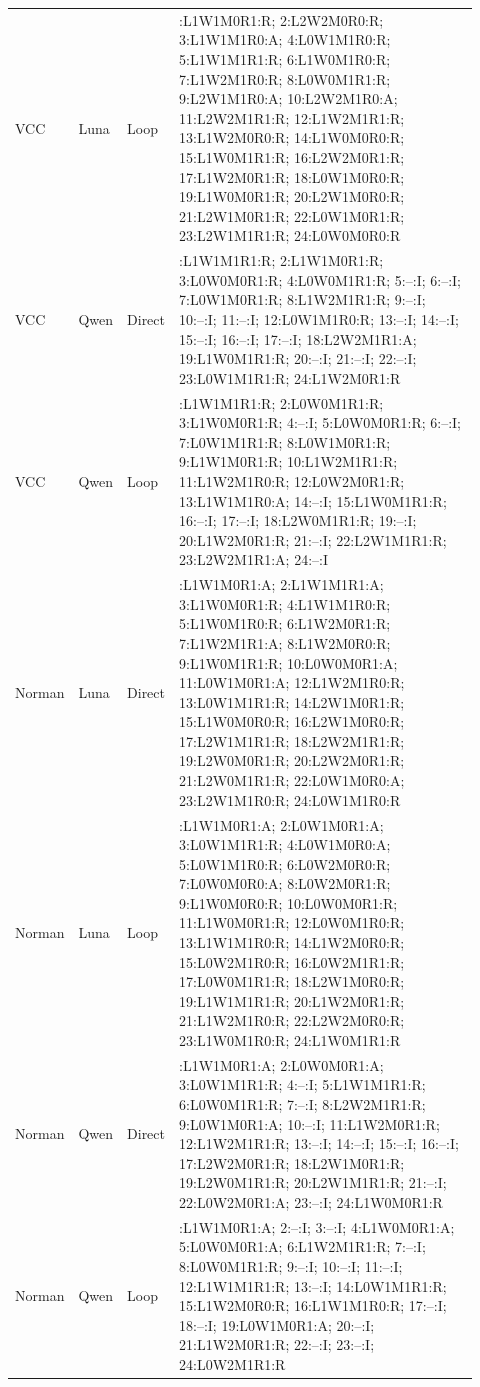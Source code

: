 \begin{longtable}{@{}p{0.10\linewidth}p{0.08\linewidth}p{0.08\linewidth}>{\raggedright\arraybackslash}p{0.66\linewidth}@{}}
VCC & Luna & Loop & 1:L1W1M0R1:R; 2:L2W2M0R0:R; 3:L1W1M1R0:A; 4:L0W1M1R0:R; 5:L1W1M1R1:R; 6:L1W0M1R0:R; 7:L1W2M1R0:R; 8:L0W0M1R1:R; 9:L2W1M1R0:A; 10:L2W2M1R0:A; 11:L2W2M1R1:R; 12:L1W2M1R1:R; 13:L1W2M0R0:R; 14:L1W0M0R0:R; 15:L1W0M1R1:R; 16:L2W2M0R1:R; 17:L1W2M0R1:R; 18:L0W1M0R0:R; 19:L1W0M0R1:R; 20:L2W1M0R0:R; 21:L2W1M0R1:R; 22:L0W1M0R1:R; 23:L2W1M1R1:R; 24:L0W0M0R0:R \\[3pt]
VCC & Qwen & Direct & 1:L1W1M1R1:R; 2:L1W1M0R1:R; 3:L0W0M0R1:R; 4:L0W0M1R1:R; 5:--:I; 6:--:I; 7:L0W1M0R1:R; 8:L1W2M1R1:R; 9:--:I; 10:--:I; 11:--:I; 12:L0W1M1R0:R; 13:--:I; 14:--:I; 15:--:I; 16:--:I; 17:--:I; 18:L2W2M1R1:A; 19:L1W0M1R1:R; 20:--:I; 21:--:I; 22:--:I; 23:L0W1M1R1:R; 24:L1W2M0R1:R \\[3pt]
VCC & Qwen & Loop & 1:L1W1M1R1:R; 2:L0W0M1R1:R; 3:L1W0M0R1:R; 4:--:I; 5:L0W0M0R1:R; 6:--:I; 7:L0W1M1R1:R; 8:L0W1M0R1:R; 9:L1W1M0R1:R; 10:L1W2M1R1:R; 11:L1W2M1R0:R; 12:L0W2M0R1:R; 13:L1W1M1R0:A; 14:--:I; 15:L1W0M1R1:R; 16:--:I; 17:--:I; 18:L2W0M1R1:R; 19:--:I; 20:L1W2M0R1:R; 21:--:I; 22:L2W1M1R1:R; 23:L2W2M1R1:A; 24:--:I \\[3pt]
Norman & Luna & Direct & 1:L1W1M0R1:A; 2:L1W1M1R1:A; 3:L1W0M0R1:R; 4:L1W1M1R0:R; 5:L1W0M1R0:R; 6:L1W2M0R1:R; 7:L1W2M1R1:A; 8:L1W2M0R0:R; 9:L1W0M1R1:R; 10:L0W0M0R1:A; 11:L0W1M0R1:A; 12:L1W2M1R0:R; 13:L0W1M1R1:R; 14:L2W1M0R1:R; 15:L1W0M0R0:R; 16:L2W1M0R0:R; 17:L2W1M1R1:R; 18:L2W2M1R1:R; 19:L2W0M0R1:R; 20:L2W2M0R1:R; 21:L2W0M1R1:R; 22:L0W1M0R0:A; 23:L2W1M1R0:R; 24:L0W1M1R0:R \\[3pt]
Norman & Luna & Loop & 1:L1W1M0R1:A; 2:L0W1M0R1:A; 3:L0W1M1R1:R; 4:L0W1M0R0:A; 5:L0W1M1R0:R; 6:L0W2M0R0:R; 7:L0W0M0R0:A; 8:L0W2M0R1:R; 9:L1W0M0R0:R; 10:L0W0M0R1:R; 11:L1W0M0R1:R; 12:L0W0M1R0:R; 13:L1W1M1R0:R; 14:L1W2M0R0:R; 15:L0W2M1R0:R; 16:L0W2M1R1:R; 17:L0W0M1R1:R; 18:L2W1M0R0:R; 19:L1W1M1R1:R; 20:L1W2M0R1:R; 21:L1W2M1R0:R; 22:L2W2M0R0:R; 23:L1W0M1R0:R; 24:L1W0M1R1:R \\[3pt]
Norman & Qwen & Direct & 1:L1W1M0R1:A; 2:L0W0M0R1:A; 3:L0W1M1R1:R; 4:--:I; 5:L1W1M1R1:R; 6:L0W0M1R1:R; 7:--:I; 8:L2W2M1R1:R; 9:L0W1M0R1:A; 10:--:I; 11:L1W2M0R1:R; 12:L1W2M1R1:R; 13:--:I; 14:--:I; 15:--:I; 16:--:I; 17:L2W2M0R1:R; 18:L2W1M0R1:R; 19:L2W0M1R1:R; 20:L2W1M1R1:R; 21:--:I; 22:L0W2M0R1:A; 23:--:I; 24:L1W0M0R1:R \\[3pt]
Norman & Qwen & Loop & 1:L1W1M0R1:A; 2:--:I; 3:--:I; 4:L1W0M0R1:A; 5:L0W0M0R1:A; 6:L1W2M1R1:R; 7:--:I; 8:L0W0M1R1:R; 9:--:I; 10:--:I; 11:--:I; 12:L1W1M1R1:R; 13:--:I; 14:L0W1M1R1:R; 15:L1W2M0R0:R; 16:L1W1M1R0:R; 17:--:I; 18:--:I; 19:L0W1M0R1:A; 20:--:I; 21:L1W2M0R1:R; 22:--:I; 23:--:I; 24:L0W2M1R1:R \\[3pt]

\end{longtable}
